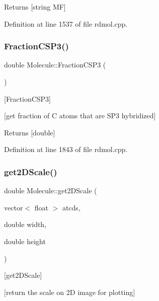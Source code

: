 \begin{DoxyReturn}{Returns}
\mbox{[}string MF\mbox{]} 
\end{DoxyReturn}


Definition at line 1537 of file rdmol.\+cpp.

\mbox{\label{class_molecule_a9fe4d5adae1305a7eeb0a7f4a7b5bcad}} 
\subsubsection{\texorpdfstring{Fraction\+C\+S\+P3()}{FractionCSP3()}}
{\footnotesize\ttfamily double Molecule\+::\+Fraction\+C\+S\+P3 (\begin{DoxyParamCaption}{ }\end{DoxyParamCaption})}



\mbox{[}Fraction\+C\+S\+P3\mbox{]} 

\mbox{[}get fraction of C atoms that are S\+P3 hybridized\mbox{]}

\begin{DoxyReturn}{Returns}
\mbox{[}double\mbox{]} 
\end{DoxyReturn}


Definition at line 1843 of file rdmol.\+cpp.

\mbox{\label{class_molecule_ac36056d9d2c1f09d25f70abdd88e7233}} 
\subsubsection{\texorpdfstring{get2\+D\+Scale()}{get2DScale()}}
{\footnotesize\ttfamily double Molecule\+::get2\+D\+Scale (\begin{DoxyParamCaption}\item[{vector$<$ float $>$}]{atcds,  }\item[{double}]{width,  }\item[{double}]{height }\end{DoxyParamCaption})}



\mbox{[}get2\+D\+Scale\mbox{]} 

\mbox{[}return the scale on 2D image for plotting\mbox{]}

